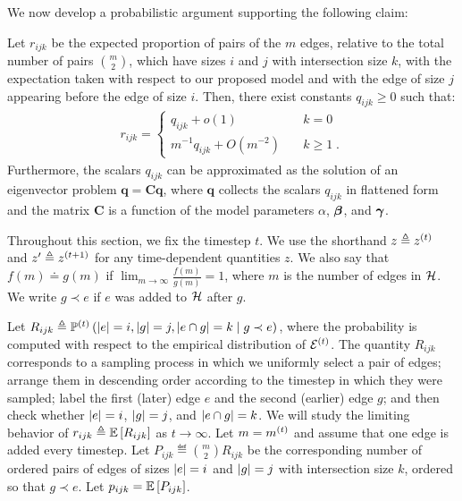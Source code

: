 We now develop a probabilistic argument supporting the following claim: 
\begin{clm*}
    Let $r_{ijk}$ be the expected proportion of pairs of the $m$ edges, relative to the total number of pairs $\binom{m}{2}$, which have sizes $i$ and $j$ with intersection size $k$,  with the expectation taken with respect to our proposed model and with the edge of size $j$ appearing before the edge of size $i$. 
    Then, there exist constants $q_{ijk} \geq 0$ such that: 
    \begin{align}
        r_{ijk} = \begin{cases}
            q_{ijk} + o(1) &\quad k = 0 \\ 
            m^{-1}q_{ijk} + O(m^{-2}) &\quad k \geq 1\;. 
        \end{cases}
    \end{align}
    Furthermore, the scalars $q_{ijk}$ can be approximated as the solution of an eigenvector problem $\mathbf{q} = \mathbf{C}\mathbf{q}$, where $\mathbf{q}$ collects the scalars $q_{ijk}$ in flattened form and the matrix $\mathbf{C}$ is a function of the model parameters $\alpha$, $\boldsymbol{\beta}$, and $\boldsymbol{\gamma}$.
\end{clm*}


Throughout this section, we fix the timestep $t$. 
We use the shorthand $z \triangleq z^{(t)}$ and $z' \triangleq z^{(t+1)}$ for any time-dependent quantities $z$. 
We also say that $f(m) \doteq g(m)$ if $\lim_{m\rightarrow \infty} \frac{f(m)}{g(m)} = 1$, where $m$ is the number of edges in $\cH$. 
We write $g \prec e$ if $e$ was added to $\cH$ after $g$. 


Let $R_{ijk} \eqdef \prob[t]{\abs{e} = i, \abs{g} = j, \abs{e\cap g} = k \given g \prec e}$, where 
the probability is computed with respect to the empirical distribution of $\at{\cE}{t}$. 
The quantity $R_{ijk}$ corresponds to a sampling process in which we uniformly select a pair of edges; arrange them in descending order according to the timestep in which they were sampled; label the first (later) edge $e$ and the second (earlier) edge $g$; and then check whether $\left\lvert e \right\rvert = i$, $\left\lvert g \right\rvert = j$, and $\left\lvert e\cap g \right\rvert = k$.
We will study the limiting behavior of $r_{ijk} \eqdef \E{R_{ijk}} $ as $t \rightarrow \infty$. 
Let $m = m^{(t)}$ and assume that one edge is added every timestep. 
Let $P_{ijk} \eqdef \binom{m}{2} R_{ijk}$ be the corresponding number of ordered pairs of edges of sizes $\left\lvert e \right\rvert = i$ and $\left\lvert g \right\rvert = j$ with intersection size $k$, ordered so that $g \prec e$.
Let $p_{ijk} = \E{P_{ijk}}$.

